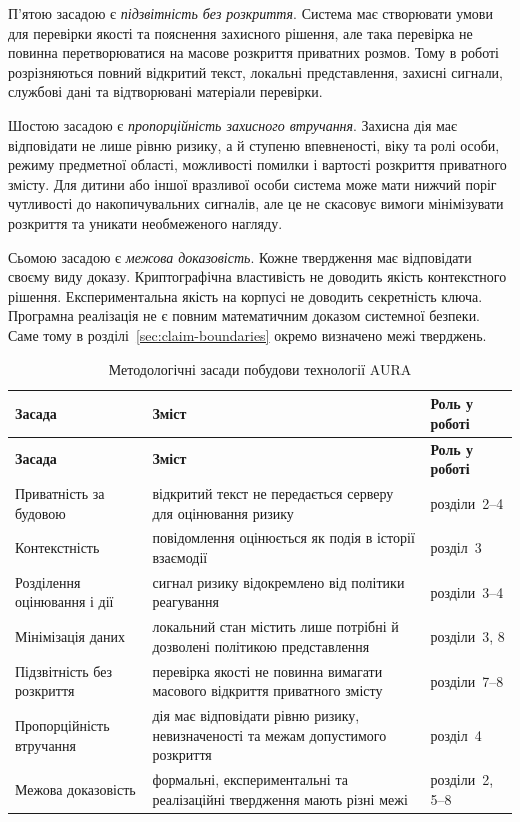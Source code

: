 П'ятою засадою є \emph{підзвітність без розкриття}. Система має створювати умови для перевірки якості та пояснення захисного рішення, але така перевірка не повинна перетворюватися на масове розкриття приватних розмов. Тому в роботі розрізняються повний відкритий текст, локальні представлення, захисні сигнали, службові дані та відтворювані матеріали перевірки.

Шостою засадою є \emph{пропорційність захисного втручання}. Захисна дія має відповідати не лише рівню ризику, а й ступеню впевненості, віку та ролі особи, режиму предметної області, можливості помилки і вартості розкриття приватного змісту. Для дитини або іншої вразливої особи система може мати нижчий поріг чутливості до накопичувальних сигналів, але це не скасовує вимоги мінімізувати розкриття та уникати необмеженого нагляду.

Сьомою засадою є \emph{межова доказовість}. Кожне твердження має відповідати своєму виду доказу. Криптографічна властивість не доводить якість контекстного рішення. Експериментальна якість на корпусі не доводить секретність ключа. Програмна реалізація не є повним математичним доказом системної безпеки. Саме тому в розділі~\ref{sec:claim-boundaries} окремо визначено межі тверджень.

\begin{longtable}{p{4.2cm} p{6.9cm} p{2.4cm}}
\caption{Методологічні засади побудови технології AURA}
\label{tab:methodological-principles}\\
\toprule
\textbf{Засада} & \textbf{Зміст} & \textbf{Роль у роботі} \\
\midrule
\endfirsthead
\toprule
\textbf{Засада} & \textbf{Зміст} & \textbf{Роль у роботі} \\
\midrule
\endhead
Приватність за будовою & відкритий текст не передається серверу для оцінювання ризику & розділи~2--4 \\
Контекстність & повідомлення оцінюється як подія в історії взаємодії & розділ~3 \\
Розділення оцінювання і дії & сигнал ризику відокремлено від політики реагування & розділи~3--4 \\
Мінімізація даних & локальний стан містить лише потрібні й дозволені політикою представлення & розділи~3, 8 \\
Підзвітність без розкриття & перевірка якості не повинна вимагати масового відкриття приватного змісту & розділи~7--8 \\
Пропорційність втручання & дія має відповідати рівню ризику, невизначеності та межам допустимого розкриття & розділ~4 \\
Межова доказовість & формальні, експериментальні та реалізаційні твердження мають різні межі & розділи~2, 5--8 \\
\bottomrule
\end{longtable}

